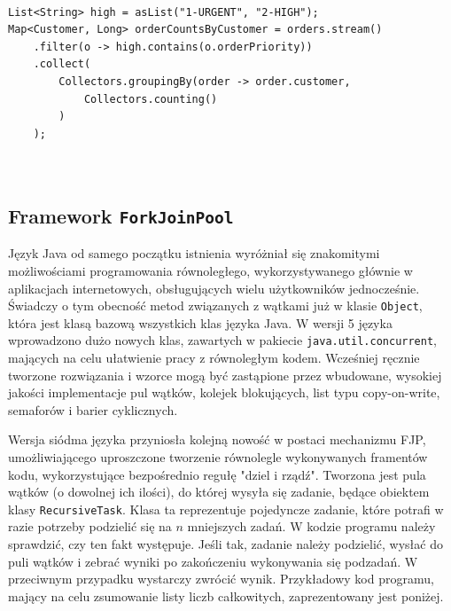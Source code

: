 \documentclass[12pt]{extarticle}
\begin{document}
\begin{lstlisting}[label=advanced, caption=Zaawansowane wykorzystanie Stream API]

List<String> high = asList("1-URGENT", "2-HIGH");
Map<Customer, Long> orderCountsByCustomer = orders.stream()
    .filter(o -> high.contains(o.orderPriority))
    .collect(
        Collectors.groupingBy(order -> order.customer,
            Collectors.counting()
        )
    );
    
    

\end{lstlisting}

\subsection{Framework \texttt{ForkJoinPool}}

    Język Java od samego początku istnienia wyróżniał się znakomitymi możliwościami programowania równoległego, wykorzystywanego głównie w aplikacjach internetowych, obsługujących wielu użytkowników jednocześnie. Świadczy o tym obecność metod związanych z wątkami już w klasie \texttt{Object}, która jest klasą bazową wszystkich klas języka Java. W wersji 5 języka wprowadzono dużo nowych klas, zawartych w pakiecie \texttt{java.util.concurrent}, mających na celu ułatwienie pracy z równoległym kodem. Wcześniej ręcznie tworzone rozwiązania i wzorce mogą być zastąpione przez wbudowane, wysokiej jakości implementacje pul wątków, kolejek blokujących, list typu copy-on-write, semaforów i barier cyklicznych.
    
    Wersja siódma języka przyniosła kolejną nowość w postaci mechanizmu FJP, umożliwiającego uproszczone tworzenie równolegle wykonywanych framentów kodu, wykorzystujące bezpośrednio regułę "dziel i rządź". Tworzona jest pula wątków (o dowolnej ich ilości), do której wysyła się zadanie, będące obiektem klasy \texttt{RecursiveTask}. Klasa ta reprezentuje pojedyncze zadanie, które potrafi w razie potrzeby podzielić się na $ n $ mniejszych zadań. W kodzie programu należy sprawdzić, czy ten fakt występuje. Jeśli tak, zadanie należy podzielić, wysłać do puli wątków i zebrać wyniki po zakończeniu wykonywania się podzadań. W przeciwnym przypadku wystarczy zwrócić wynik. Przykładowy kod programu, mający na celu zsumowanie listy liczb całkowitych, zaprezentowany jest poniżej. 
\end{document}
